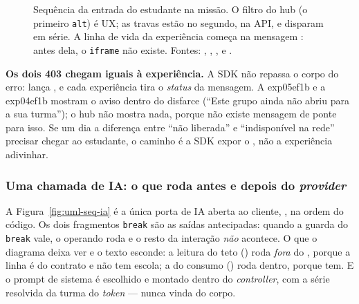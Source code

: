 \begin{figure}[H]
{}
\caption[Sequência: a entrada do estudante na missão]{Sequência da entrada do
  estudante na missão. O filtro do hub (o primeiro \texttt{alt}) é UX; as travas
  estão no segundo, na API, e disparam em série. A linha de vida da experiência
  começa na mensagem : antes dela, o \texttt{iframe} não existe.
  Fontes: , ,
  ,  e
  .}
\label{fig:uml-seq-entrada}
\end{figure}

\begin{nota}
\textbf{Os dois 403 chegam iguais à experiência.} A SDK não repassa o corpo do
erro:  lança , e cada experiência tira
o \emph{status} da mensagem. A exp05ef1b e a exp04ef1b mostram o aviso dentro do
disfarce (\enquote{Este grupo ainda não abriu para a sua turma}); o hub não mostra
nada, porque não existe mensagem de ponte para isso. Se um dia a diferença entre
\enquote{não liberada} e \enquote{indisponível na rede} precisar chegar ao
estudante, o caminho é a SDK expor o , não a experiência adivinhar.
\end{nota}

\subsubsection{Uma chamada de IA: o que roda antes e depois do \emph{provider}}

A Figura~\ref{fig:uml-seq-ia} é a única porta de IA aberta ao cliente,
, na ordem do código. Os dois fragmentos \texttt{break} são
as saídas antecipadas: quando a guarda do \texttt{break} vale, o operando roda e o
resto da interação \emph{não} acontece. O que o diagrama deixa ver e o texto
esconde: a leitura do teto () roda \emph{fora} do
, porque a linha é do contrato e não tem escola; a do consumo
() roda dentro, porque tem. E o prompt de sistema é escolhido
e montado dentro do \emph{controller}, com a série resolvida da turma do
\emph{token} --- nunca vinda do corpo.

